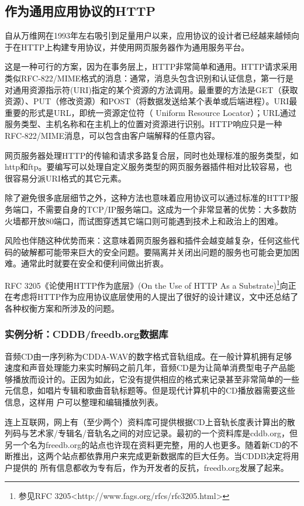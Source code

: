 \documentclass[12pt,oneside]{book}
\begin{document}
\begin{common-format}
\subsection{作为通用应用协议的HTTP}
自从万维网在1993年左右吸引到足量用户以来，应用协议的设计者已经越来越倾向于在HTTP上构建专用协议，并使用网页服务器作为通用服务平台。

这是一种可行的方案，因为在事务层上，HTTP非常简单和通用。HTTP请求采用类似RFC-822/MIME格式的消息：通常，消息头包含识别和认证信息，第一行是对通用资源指示符(URI)指定的某个资源的方法调用。最重要的方法是GET（获取资源）、PUT（修改资源）和POST（将数据发送给某个表单或后端进程）。URI最重要的形式是URL，即统一资源定位符（ Uniform Resource Locator）；URL通过服务类型、主机名称和在主机上的位置对资源进行识别。HTTP响应只是一种RFC-822/MIME消息，可以包含由客户端解释的任意内容。

网页服务器处理HTTP的传输和请求多路复合层，同时也处理标准的服务类型，如http和ftp。要编写可以处理自定义服务类型的网页服务器插件相对比较容易，也很容易分派URI格式的其它元素。

除了避免很多底层细节之外，这种方法也意味着应用协议可以通过标准的HTTP服务端口，不需要自身的TCP/IP服务端口。这成为一个非常显著的优势：大多数防火墙都开放80端口，而试图穿透其它端口则可能遇到技术上和政治上的困难。

风险也伴随这种优势而来：这意味着网页服务器和插件会越变越复杂，任何这些代码的破解都可能带来巨大的安全问题。要隔离并关闭出问题的服务也可能会更加困难。通常此时就要在安全和便利间做出折衷。

RFC 3205《论使用HTTP作为底层》(On the Use of HTTP As a Substrate)\footnote{参见RFC 3205<http://www.fags.org/rfcs/rfc3205.html>}向正在考虑将HTTP作为应用协议底层使用的人提出了很好的设计建议，文中还总结了各种权衡方案和所涉及的问题。

\subsubsection{实例分析：CDDB/freedb.org数据库}
音频CD由一序列称为CDDA-WAV的数字格式音轨组成。在一般计算机拥有足够速度和声音处理能力来实时解码之前几年，音频CD是为让简单消费型电子产品能够播放而设计的。正因为如此，它没有提供相应的格式来记录甚至非常简单的一些元信息，如唱片专辑和歌曲音轨标题等。但是现代计算机中的CD播放器需要这些信息，这样用
户可以整理和编辑播放列表。

连上互联网，网上有（至少两个）资料库可提供根据CD上音轨长度表计算出的散列码与艺术家/专辑名/音轨名之间的对应记录。最初的一个资料库是cddb.org，但另一个名为freedb.org的站点也许现在资料更完整，用的人也更多。随着新CD的不断推出，这两个站点都依靠用户来完成更新数据库的巨大任务。当CDDB决定将用户提供的
所有信息都收为专有后，作为开发者的反抗，freedb.org发展了起来。


\end{common-format}
\end{document}
